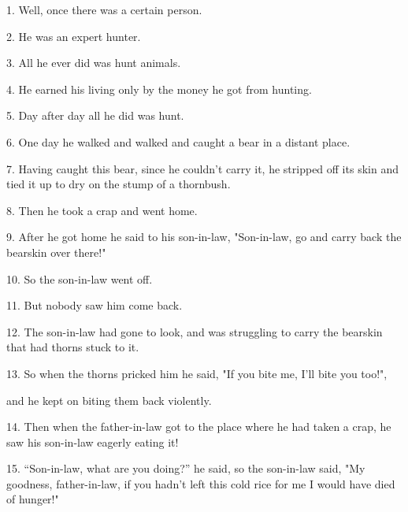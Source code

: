 \setcounter{footnote}{0}

1. Well, once there was a certain person.

2. He was an expert hunter.

3. All he ever did was hunt animals.

4. He earned his living only by the money he got from hunting.

5. Day after day all he did was hunt.

6. One day he walked and walked and caught a bear in a distant place.

7. Having caught this bear, since he couldn't carry it, he stripped off its skin
and tied it up to dry on the stump of a thornbush.

8. Then he took a crap and went home.

9. After he got home he said to his son-in-law, "Son-in-law, go and carry
back the bearskin over there!"

10. So the son-in-law went off.

11. But nobody saw him come back.

12. The son-in-law had gone to look, and was struggling to carry the bearskin that
had thorns stuck to it.

13. So when the thorns pricked him he said, "If you bite me, I'll bite
you too!",

and he kept on biting them back violently.

14. Then when the father-in-law got to the place where he had taken a crap, he saw
his son-in-law eagerly eating it!

15. ``Son-in-law, what are you doing?'' he said, so the son-in-law
said, "My goodness, father-in-law, if you hadn't left this cold rice for
me I would have died of hunger!"

